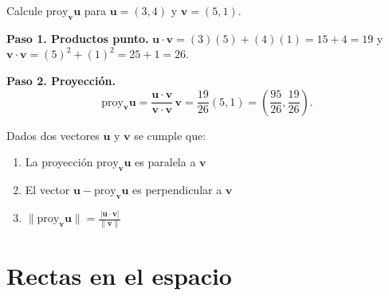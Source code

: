 \begin{example}
Calcule $\text{proy}_{\mathbf{v}}\mathbf{u}$ para $\mathbf{u} = (3, 4)$ y $\mathbf{v} = (5, 1)$.
\begin{myproof}
\textbf{Paso 1. Productos punto.} $\mathbf{u} \cdot \mathbf{v}= (3)(5) + (4)(1) = 15 + 4 = 19$ y $\mathbf{v} \cdot \mathbf{v} = (5)^2 + (1)^2 = 25 + 1 = 26.$

\textbf{Paso 2. Proyección.}
\[
\text{proy}_{\mathbf{v}}\mathbf{u} = \frac{\mathbf{u} \cdot \mathbf{v}}{\mathbf{v} \cdot \mathbf{v}}\,\mathbf{v} = \frac{19}{26}(5, 1) = \boxed{\left(\frac{95}{26}, \frac{19}{26}\right)}.
\]
\end{myproof}
\end{example}

\begin{theorem} Dados dos vectores $\mathbf{u}$ y $\mathbf{v}$ se cumple que:
\begin{enumerate}
\item La proyección $\text{proy}_{\mathbf{v}}\mathbf{u}$ es paralela a $\mathbf{v}$
\item El vector $\mathbf{u} - \text{proy}_{\mathbf{v}}\mathbf{u}$ es perpendicular a $\mathbf{v}$
\item $\|\text{proy}_{\mathbf{v}}\mathbf{u}\| = \frac{|\mathbf{u} \cdot \mathbf{v}|}{\|\mathbf{v}\|}$
\end{enumerate}
\end{theorem}

\section{Rectas en el espacio}

